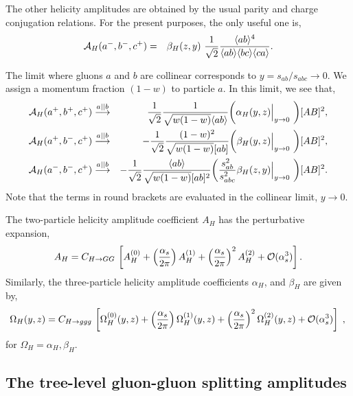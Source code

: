 \documentclass[paper,notoc,nohyper]{JHEP3}
\begin{document}
The other helicity amplitudes are obtained by the usual parity and charge
conjugation relations.  For the present purposes, the only useful one is,
\begin{eqnarray}
\label{eq:helamphggg3}
{\cal A}_{H}(a^-, b^-, c^+) &=& 
\beta_H(z,y)~\frac{1}{\sqrt{2}}\frac{\langle ab \rangle^4}{\langle ab
\rangle\langle bc \rangle\langle ca \rangle}. 
\end{eqnarray}


The limit where gluons $a$ and $b$ are collinear corresponds
to $y = s_{ab}/s_{abc} \to 0$.  We assign a momentum fraction $(1-w)$ to particle $a$.  In this limit,
we see that,
\begin{eqnarray}
{\cal A}_{H}(a^+,b^+,c^+) &\stackrel{a||b}{\longrightarrow}&
 \frac{1}{\sqrt{2}} 
 \frac{1}{\sqrt{w(1-w)}\langle ab\rangle}
 \biggl( \alpha_H(y,z)\Big|_{y \to 0}~\biggr)[A B]^2,\nonumber \\
{\cal A}_{H}(a^+ ,b^- ,c^+) &\stackrel{a||b}{\longrightarrow}& 
-\frac{1}{\sqrt{2}}\frac{(1-w)^2}{\sqrt{w(1-w)}[ab]}
 \biggl( \beta_H(y,z)\Big|_{y \to 0}~\biggr)[A B]^2,\nonumber \\
{\cal A}_{H}(a^-, b^- ,c^+) &\stackrel{a||b}{\longrightarrow}& 
-\frac{1}{\sqrt{2}}\frac{\langle ab\rangle}{\sqrt{w(1-w)}[ab]^2}
\biggl(\frac{s_{ab}^2}{s_{abc}^2} \beta_H(z,y)\Big|_{y \to 0}~\biggr)[A B]^2.
\end{eqnarray}
Note that the terms in round brackets are evaluated in the collinear limit, $y \to 0$.

The two-particle helicity amplitude coefficient $A_H$ 
has the perturbative expansion,
\begin{equation}
A_H =    C_{H \to GG}\, \left[
A_H^{(0)}  
+ \left(\frac{\alpha_s}{2\pi}\right) A_H^{(1)}  
+ \left(\frac{\alpha_s}{2\pi}\right)^2 A_H^{(2)} 
+ {\cal O}(\alpha_s^3) \right] .
\end{equation}
Similarly, the three-particle helicity amplitude coefficients $\alpha_H$,
and $\beta_H$ are given by, 
\begin{equation}
\Omega_H(y,z) =  C_{H\to ggg}\, \left[
\Omega_H^{(0)}(y,z)  
+ \left(\frac{\alpha_s}{2\pi}\right) \Omega_H^{(1)}(y,z)  
+ \left(\frac{\alpha_s}{2\pi}\right)^2 \Omega_H^{(2)}(y,z) 
+ {\cal O}(\alpha_s^3) \right] \;,\nonumber \\
\end{equation}
for $\Omega_H = \alpha_H,\beta_H$.



\subsection{The tree-level gluon-gluon splitting amplitudes}
\end{document}
